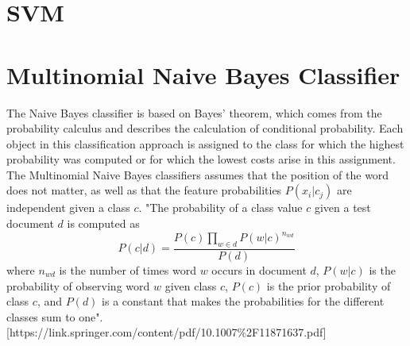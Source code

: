 \documentclass[a4paper, 11pt,titlepage,oneside,openany]{book}
\begin{document}
\section{SVM}
\section{Multinomial Naive Bayes Classifier}
The Naive Bayes classifier is based on  Bayes' theorem, which comes from the probability calculus and describes the calculation of conditional probability. Each object in this classification approach is assigned to the class for which the highest probability was computed or for which the lowest costs arise in this assignment.  \\
\noindent The Multinomial Naive Bayes classifiers assumes that the position of the word does not matter, as well as  that the feature probabilities $P(x_i|c_j)$ are independent given a class $c$.
"The probability of a class value $c$ given a test document $d$ is computed as
\[
P(c|d)=\frac{P(c)\prod \limits_{w \in d}P(w|c)^{n_{wd}} }{P(d)}
\]
where $n_{wd}$ is the number of times word $w$ occurs in document $d$, $P(w|c)$ is the probability of observing word $w$ given class $c$, $P(c)$ is the prior probability of class $c$, and $P(d)$ is a constant that makes the probabilities for the different classes sum to one". [https://link.springer.com/content/pdf/10.1007\%2F11871637.pdf]
\end{document}
